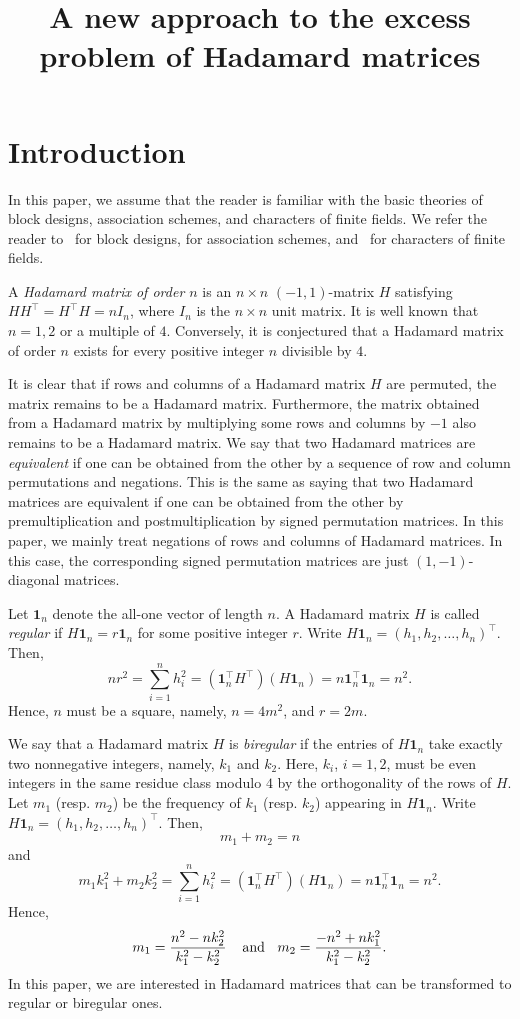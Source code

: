 \documentclass[ALCO,ThmDefs,Unicode]{cedram}
\title [A new approach to the excess problem of Hadamard matrices] {A new approach to the excess problem of Hadamard matrices}
\author{\firstname{Mitsugu} \lastname{Hirasaka}}
\author{\firstname{Koji} \lastname{Momihara}}
\author{\firstname{Sho} \lastname{Suda}}
\newcommand*\tra{\top}
\newcommand*{\un}{\mathbf{1}}
\begin{document}
\maketitle


\section{Introduction}\label{sec:int}
In this paper, we assume that the reader is familiar with the basic theories of block designs, association schemes, and characters of finite fields. We refer the reader to~\cite{BJL} for block designs, \cite{BI} for association schemes, and~\cite{BEW97,LN97} for characters of finite fields.


A \emph{Hadamard matrix of order $n$} is an $n\times n$ $(-1,1)$-matrix $H$ satisfying $HH^\tra=H^\tra H=nI_n$, where $I_n$ is the $n\times n$ unit matrix. It is well known that $n=1,2$ or a multiple of $4$. Conversely, it is conjectured that a Hadamard matrix of order $n$ exists for every positive integer $n$ divisible by $4$.

It is clear that if rows and columns of a Hadamard matrix $H$ are permuted, the matrix remains to be a Hadamard matrix. Furthermore, the matrix obtained from a Hadamard matrix by multiplying some rows and columns by $-1$ also remains to be a Hadamard matrix. We say that two Hadamard matrices are \emph{equivalent} if one can be obtained from the other by a sequence of row and column permutations and negations. This is the same as saying that two Hadamard matrices are equivalent if one can be obtained from the other by premultiplication and postmultiplication by signed permutation matrices. In this paper, we mainly treat negations of rows and columns of Hadamard matrices. In this case, the corresponding signed permutation matrices are just $(1,-1)$-diagonal matrices.

Let $\un_n$ denote the all-one vector of length $n$. A Hadamard matrix $H$ is called \emph{regular} if $H\un_n=r\un_n$ for some positive integer $r$. Write $H\un_n=(h_1,h_2,\ldots,h_n)^\tra$. Then,
\[
nr^2=\sum_{i=1}^nh_i^2=(\un_n^\tra H^{\tra})(H\un_n) =n\un_n^\tra\un_n=n^2.
\]
Hence, $n$ must be a square, namely, $n=4m^2$, and $r=2m$.

We say that a Hadamard matrix $H$ is \emph{biregular} if the entries of $H\un_n$ take exactly two nonnegative integers, namely, $k_1$ and $k_2$. Here, $k_i$, $i=1,2$, must be even integers in the same residue class modulo $4$ by the orthogonality of the rows of $H$. Let $m_1$ (resp. $m_2$) be the frequency of $k_1$ (resp. $k_2$) appearing in $H\un_n$. Write $H\un_n=(h_1,h_2,\ldots,h_n)^\tra$. Then,
\[
m_1+m_2=n
\]
and
\[
m_1k_1^2+m_2 k_2^2=\sum_{i=1}^nh_i^2=(\un_n^\tra H^{\tra})(H\un_n) =n\un_n^\tra\un_n=n^2.
\]
Hence,
\begin{equation}\label{eq:fre}
m_1=\frac{n^2-nk_2^2}{k_1^2-k_2^2}\hspace{0.4cm} \mbox{and }\hspace{0.2cm} m_2=\frac{-n^2+nk_1^2}{k_1^2-k_2^2}.
\end{equation}
In this paper, we are interested in Hadamard matrices that can be transformed to regular or biregular ones.
\end{document}
